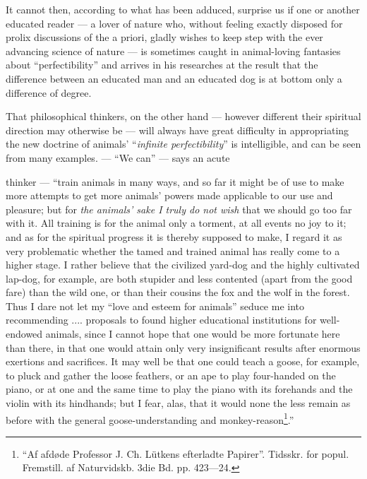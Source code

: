 \documentclass[12pt,a4paper]{book}
\begin{document}
It cannot then, according to what has been adduced, surprise us if one or another
educated reader --- a lover of nature who, without feeling exactly disposed for prolix
discussions of the a priori, gladly wishes to keep step with the ever advancing science
of nature --- is sometimes caught in animal-loving fantasies about ``perfectibility''
and arrives in his researches at the result that the difference between an educated man
and an educated dog is at bottom only a difference of degree.

That philosophical thinkers, on the other hand --- however different their spiritual
direction may otherwise be --- will always have great difficulty in appropriating the
new doctrine of animals' ``\emph{infinite perfectibility}'' is intelligible, and can be
seen from many examples. --- ``We can'' --- says an acute

\setcounter{footnote}{0}
thinker --- ``train animals in many ways, and so far it might be of use to make more
attempts to get more animals' powers made applicable to our use and pleasure; but for
\emph{the animals' sake I truly do not wish} that we should go too far with it. All
training is for the animal only a torment, at all events no joy to it; and as for the
spiritual progress it is thereby supposed to make, I regard it as very problematic
whether the tamed and trained animal has really come to a higher stage. I rather
believe that the civilized yard-dog and the highly cultivated lap-dog, for example, are
both stupider and less contented (apart from the good fare) than the wild one, or than
their cousins the fox and the wolf in the forest. Thus I dare not let my ``love and
esteem for animals'' seduce me into recommending .... proposals to found higher
educational institutions for well-endowed animals, since I cannot hope that one would
be more fortunate here than there, in that one would attain only very insignificant
results after enormous exertions and sacrifices. It may well be that one could teach a
goose, for example, to pluck and gather the loose feathers,
or an ape to play four-handed on the piano, or at one and the same time to play the
piano with its forehands and the violin with its hindhands; but I fear, alas, that it
would none the less remain as before with the general goose-understanding and
monkey-reason\footnote{``Af afdøde Professor J. Ch. Lütkens efterladte Papirer''.
Tidsskr. for popul. Fremstill. af Naturvidskb. 3die Bd. pp. 423---24.}.''
\end{document}
